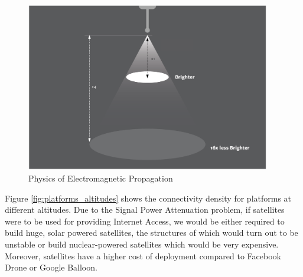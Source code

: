 \documentclass{llncs}
\begin{document}
    \begin{figure}[ht]
	\centering
	\includegraphics[width=0.95\textwidth]{fig1}
	\caption{Physics of Electromagnetic Propagation}
	\label{fig:signal_power_attenuation}
    \end{figure}
    
    Figure \ref{fig:platforms_altitudes} shows the connectivity density for platforms at
    different altitudes. Due to the Signal Power Attenuation problem, if satellites were to be used for providing 
    Internet Access, we would be either required to build huge, solar powered satellites, the structures of which
    would turn out to be unstable or build nuclear-powered satellites which would be very expensive. Moreover, 
    satellites have a higher cost of deployment compared to Facebook Drone or Google Balloon. 
    
\end{document}

